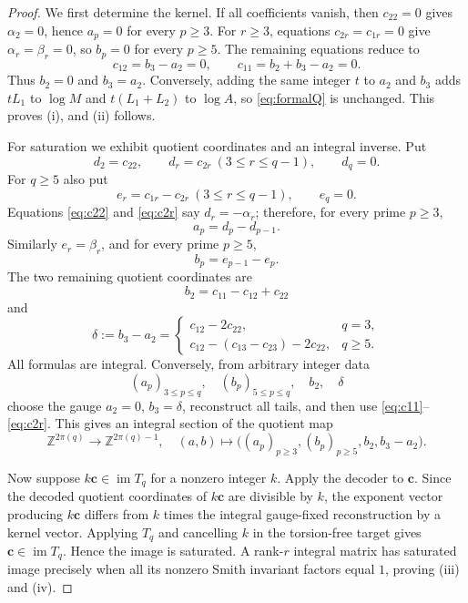 \documentclass[11pt]{article}
\theoremstyle{definition}
\theoremstyle{remark}
\newcommand{\Z}{\mathbb Z}
\newcommand{\im}{\operatorname{im}}
\newcommand{\vct}[1]{\bm{#1}}
\begin{document}
\begin{proof}
We first determine the kernel.  If all coefficients vanish, then
$c_{22}=0$ gives $\alpha_2=0$, hence $a_p=0$ for every $p\ge3$.
For $r\ge3$, equations $c_{2r}=c_{1r}=0$ give $\alpha_r=\beta_r=0$, so
$b_p=0$ for every $p\ge5$.  The remaining equations reduce to
\[
 c_{12}=b_3-a_2=0,
 \qquad
 c_{11}=b_2+b_3-a_2=0.
\]
Thus $b_2=0$ and $b_3=a_2$.  Conversely, adding the same integer $t$ to
$a_2$ and $b_3$ adds $tL_1$ to $\log M$ and $t(L_1+L_2)$ to $\log A$, so
\eqref{eq:formalQ} is unchanged.  This proves (i), and (ii) follows.

For saturation we exhibit quotient coordinates and an integral inverse.  Put
\begin{equation}\label{eq:dcoords}
 d_2=c_{22},\qquad d_r=c_{2r}\ (3\le r\le q-1),\qquad d_q=0.
\end{equation}
For $q\ge5$ also put
\begin{equation}\label{eq:ecoords}
 e_r=c_{1r}-c_{2r}\ (3\le r\le q-1),\qquad e_q=0.
\end{equation}
Equations \eqref{eq:c22} and \eqref{eq:c2r} say $d_r=-\alpha_r$;
therefore, for every prime $p\ge3$,
\begin{equation}\label{eq:adec}
 a_p=d_p-d_{p-1}.
\end{equation}
Similarly $e_r=\beta_r$, and for every prime $p\ge5$,
\begin{equation}\label{eq:bdec}
 b_p=e_{p-1}-e_p.
\end{equation}
The two remaining quotient coordinates are
\begin{equation}\label{eq:b2dec}
 b_2=c_{11}-c_{12}+c_{22}
\end{equation}
and
\begin{equation}\label{eq:deltadec}
 \delta:=b_3-a_2=
 \begin{cases}
 c_{12}-2c_{22},&q=3,\\[0.3em]
 c_{12}-(c_{13}-c_{23})-2c_{22},&q\ge5.
 \end{cases}
\end{equation}
All formulas are integral.  Conversely, from arbitrary integer data
\[
 (a_p)_{3\le p\le q},\quad
 (b_p)_{5\le p\le q},\quad b_2,\quad\delta
\]
choose the gauge $a_2=0$, $b_3=\delta$, reconstruct all tails, and then use
\eqref{eq:c11}--\eqref{eq:c2r}.  This gives an integral section of the quotient
map
\[
 \Z^{2\pi(q)}\longrightarrow
 \Z^{2\pi(q)-1},
 \quad
 (a,b)\longmapsto
 \bigl((a_p)_{p\ge3},(b_p)_{p\ge5},b_2,b_3-a_2\bigr).
\]

Now suppose $k\vct c\in\im T_q$ for a nonzero integer $k$.  Apply the decoder
to $\vct c$.  Since the decoded quotient coordinates of $k\vct c$ are divisible
by $k$, the exponent vector producing $k\vct c$ differs from $k$ times the
integral gauge-fixed reconstruction by a kernel vector.  Applying $T_q$ and
cancelling $k$ in the torsion-free target gives $\vct c\in\im T_q$.  Hence the
image is saturated.  A rank-$r$ integral matrix has saturated image precisely
when all its nonzero Smith invariant factors equal $1$, proving (iii) and (iv).
\end{proof}
\end{document}

